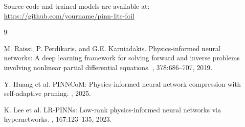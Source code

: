 \documentclass[11pt,letterpaper]{article}
\begin{document}
Source code and trained models are available at: \url{https://github.com/yourname/pinn-lite-foil}


\begin{thebibliography}{9}

M. Raissi, P. Perdikaris, and G.E. Karniadakis.
\newblock Physics-informed neural networks: A deep learning framework for solving forward and inverse problems involving nonlinear partial differential equations.
, 378:686--707, 2019.

Y. Huang et al.
\newblock PINNCoM: Physics-informed neural network compression with self-adaptive pruning.
, 2025.

K. Lee et al.
\newblock LR-PINNs: Low-rank physics-informed neural networks via hypernetworks.
, 167:123--135, 2023.

\end{thebibliography}
\end{document}
